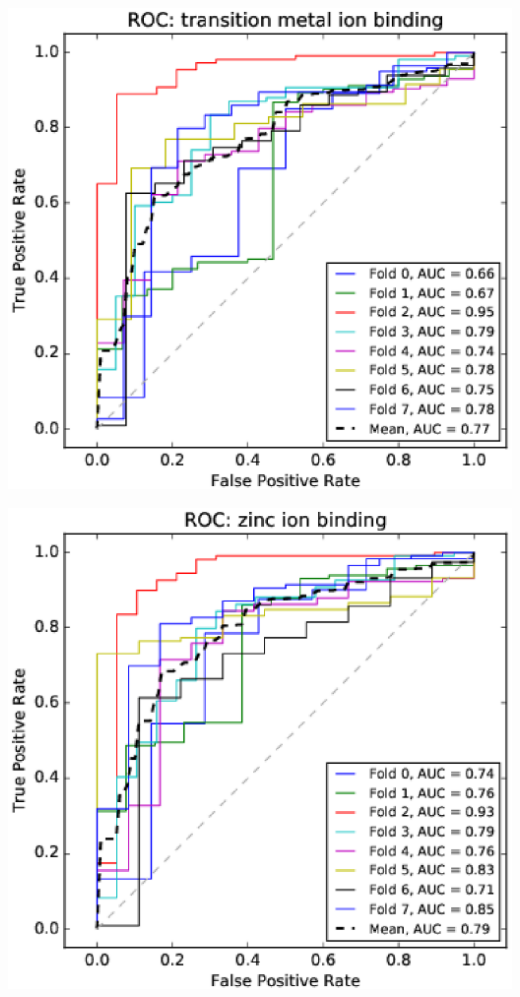 \documentclass[11pt,twoside,a4paper]{book}
\newenvironment{Figure}
  {\par\medskip\noindent\minipage{\linewidth}}
  {\endminipage\par\medskip}
\begin{document}
\begin{multicols}{2}
\begin{Figure}\begin{center}\includegraphics[width=\linewidth]{figures/roc_transition_metal_ion_binding}\label{fig:roc_transition_metal_ion_binding}\end{center}\end{Figure}
\begin{Figure}\begin{center}\includegraphics[width=\linewidth]{figures/roc_zinc_ion_binding}\label{fig:roc_zinc_ion_binding}\end{center}\end{Figure}

\end{multicols}
\end{document}
